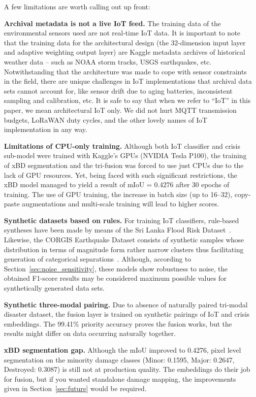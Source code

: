 \documentclass[journal]{IEEEtran}
\begin{document}
A few limitations are worth calling out up front:

\textbf{Archival metadata is not a live IoT feed.} The training data of the environmental sensors used are not real-time IoT data. It is important to note that the training data for the architectural design (the 32-dimension input layer and adaptive weighting output layer) are Kaggle metadata archives of historical weather data -- such as NOAA storm tracks, USGS earthquakes, etc. Notwithstanding that the architecture was made to cope with sensor constraints in the field, there are unique challenges in IoT implementations that archival data sets cannot account for, like sensor drift due to aging batteries, inconsistent sampling and calibration, etc. It is safe to say that when we refer to ``IoT'' in this paper, we mean architectural IoT only. We did not hurt MQTT transmission budgets, LoRaWAN duty cycles, and the other lovely names of IoT implementation in any way.

\textbf{Limitations of CPU-only training.} Although both IoT classifier and crisis sub-model were trained with Kaggle's GPUs (NVIDIA Tesla P100), the training of xBD segmentation and the tri-fusion was forced to use just CPUs due to the lack of GPU resources. Yet, being faced with such significant restrictions, the xBD model managed to yield a result of mIoU = 0.4276 after 30 epochs of training. The use of GPU training, the increase in batch size (up to 16--32), copy-paste augmentations and multi-scale training will lead to higher scores.

\textbf{Synthetic datasets based on rules.} For training IoT classifiers, rule-based syntheses have been made by means of the Sri Lanka Flood Risk Dataset~\cite{kaggle_srilanka_flood}. Likewise, the CORGIS Earthquake Dataset consists of synthetic samples whose distribution in terms of magnitude form rather narrow clusters thus facilitating generation of categorical separations~\cite{corgis_eq}. Although, according to Section~\ref{sec:noise_sensitivity}, these models show robustness to noise, the obtained F1-score results may be considered maximum possible values for synthetically generated data sets.
 
\textbf{Synthetic three-modal pairing.} Due to absence of naturally paired tri-modal disaster dataset, the fusion layer is trained on synthetic pairings of IoT and crisis embeddings. The 99.41\% priority accuracy proves the fusion works, but the results might differ on data occurring naturally together.
 
\textbf{xBD segmentation gap.} Although the mIoU improved to 0.4276, pixel level segmentation on the minority damage classes (Minor: 0.1595, Major: 0.2647, Destroyed: 0.3087) is still not at production quality. The embeddings do their job for fusion, but if you wanted standalone damage mapping, the improvements given in Section~\ref{sec:future} would be required.
 
\end{document}
